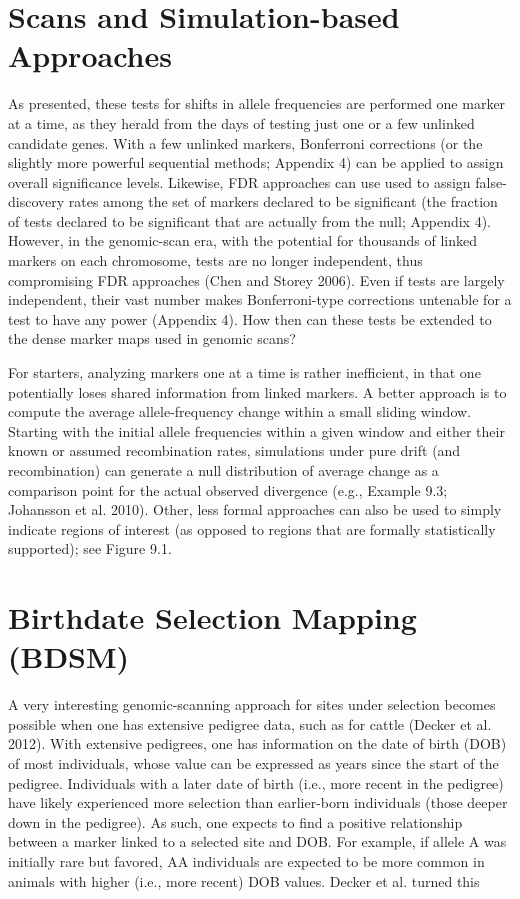 \documentclass{article}
\begin{document}
\section{Scans and Simulation-based Approaches}
As presented, these tests for shifts in allele frequencies are performed one marker at a time, as they herald from the days of testing just one or a few unlinked candidate genes. With a few unlinked markers, Bonferroni corrections (or the slightly more powerful sequential methods; Appendix 4) can be applied to assign overall significance levels. Likewise, FDR approaches can use used to assign false-discovery rates among the set of markers declared to be significant (the fraction of tests declared to be significant that are actually from the null; Appendix 4). However, in the genomic-scan era, with the potential for thousands of linked markers on each chromosome, tests are no longer independent, thus compromising FDR approaches (Chen and Storey 2006). Even if tests are largely independent, their vast number makes Bonferroni-type corrections untenable for a test to have any power (Appendix 4). How then can these tests be extended to the dense marker maps used in genomic scans?

For starters, analyzing markers one at a time is rather inefficient, in that one potentially loses shared information from linked markers. A better approach is to compute the average allele-frequency change within a small sliding window. Starting with the initial allele frequencies within a given window and either their known or assumed recombination rates, simulations under pure drift (and recombination) can generate a null distribution of average change as a comparison point for the actual observed divergence (e.g., Example 9.3; Johansson et al. 2010). Other, less formal approaches can also be used to simply indicate regions of interest (as opposed to regions that are formally statistically supported); see Figure 9.1.

\section{Birthdate Selection Mapping (BDSM)}
A very interesting genomic-scanning approach for sites under selection becomes possible when one has extensive pedigree data, such as for cattle (Decker et al. 2012). With extensive pedigrees, one has information on the date of birth (DOB) of most individuals, whose value can be expressed as years since the start of the pedigree. Individuals with a later date of birth (i.e., more recent in the pedigree) have likely experienced more selection than earlier-born individuals (those deeper down in the pedigree). As such, one expects to find a positive relationship between a marker linked to a selected site and DOB. For example, if allele A was initially rare but favored, AA individuals are expected to be more common in animals with higher (i.e., more recent) DOB values. Decker et al. turned this
\end{document}
